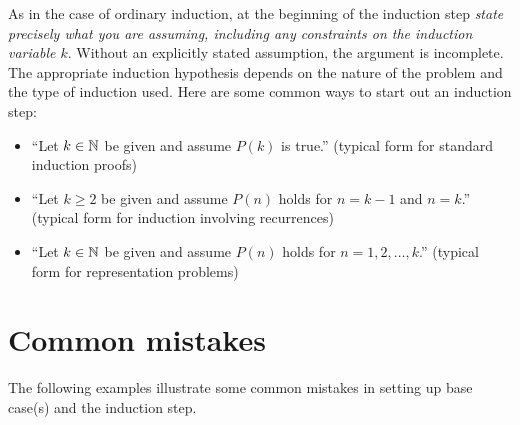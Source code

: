 \noindent
As in the case of ordinary induction, at the beginning of the 
induction step \emph{state precisely 
what you are assuming, including any constraints on the induction variable
$k$}.  Without an explicitly stated assumption, the argument is incomplete.  The
appropriate induction hypothesis depends on the nature of the problem and the
type of induction used.  Here are some common ways to start out an induction
step:
\begin{itemize}
\item ``Let $k\in \mathbb{N}$ be given and assume $P(k)$ is true.''    
(typical form for standard induction proofs)
\item ``Let $k\ge 2$ be given and assume $P(n)$ holds for $n=k-1$ and $n=k$.''
(typical form for induction involving recurrences)
\item ``Let $k\in \mathbb{N}$ be given and assume $P(n)$ holds for $n=1,2,\dots,k$.''
(typical form for representation problems)
\end{itemize}

\section{Common mistakes}
 The following examples illustrate
some common mistakes in setting up base case(s) and the induction step.

